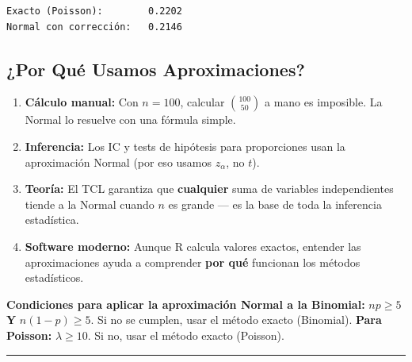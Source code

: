 \documentclass[
  letterpaper,
  DIV=11,
  numbers=noendperiod]{scrartcl}
\begin{document}
\begin{verbatim}
Exacto (Poisson):        0.2202 
Normal con corrección:   0.2146
\end{verbatim}

\subsection{¿Por Qué Usamos
Aproximaciones?}\label{por-que-usamos-aproximaciones}

\begin{enumerate}
\def\labelenumi{\arabic{enumi}.}
\item
  \textbf{Cálculo manual:} Con \(n=100\), calcular \(\binom{100}{50}\) a
  mano es imposible. La Normal lo resuelve con una fórmula simple.
\item
  \textbf{Inferencia:} Los IC y tests de hipótesis para proporciones
  usan la aproximación Normal (por eso usamos \(z_\alpha\), no \(t\)).
\item
  \textbf{Teoría:} El TCL garantiza que \textbf{cualquier} suma de
  variables independientes tiende a la Normal cuando \(n\) es grande ---
  es la base de toda la inferencia estadística.
\item
  \textbf{Software moderno:} Aunque R calcula valores exactos, entender
  las aproximaciones ayuda a comprender \textbf{por qué} funcionan los
  métodos estadísticos.
\end{enumerate}

\begin{tcolorbox}[enhanced jigsaw, arc=.35mm, bottomrule=.15mm, bottomtitle=1mm, breakable, colback=white, colbacktitle=quarto-callout-important-color!10!white, colframe=quarto-callout-important-color-frame, coltitle=black, left=2mm, leftrule=.75mm, opacityback=0, opacitybacktitle=0.6, rightrule=.15mm, title=\textcolor{quarto-callout-important-color}{\faExclamation}\hspace{0.5em}{Important}, titlerule=0mm, toprule=.15mm, toptitle=1mm]

\textbf{Condiciones para aplicar la aproximación Normal a la Binomial:}
\(np \geq 5\) \textbf{Y} \(n(1-p) \geq 5\). Si no se cumplen, usar el
método exacto (Binomial). \textbf{Para Poisson:} \(\lambda \geq 10\). Si
no, usar el método exacto (Poisson).

\end{tcolorbox}

\begin{center}\rule{0.5\linewidth}{0.5pt}\end{center}
\end{document}
